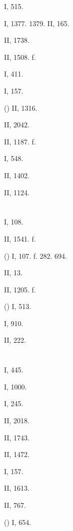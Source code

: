  I, 515.

 I, 1377. 1379. II, 165.

 II, 1738.

 II, 1508. f.

 I, 411.

 I, 157.

 () II, 1316.

 II, 2042.

 II, 1187. f.

 I, 548.

 II, 1402.

 II, 1124.

\section{}

 I, 108.

 II, 1541. f.

 () I, 107. f. 282. 694.

 II, 13.

 II, 1205. f.

 () I, 513.

 I, 910.

 II, 222.

\section{}

 I, 445.

 I, 1000.

 I, 245.

 II, 2018.

 II, 1743.

 II, 1472.

 I, 157.

 II, 1613.

 II, 767.

 () I, 654.

